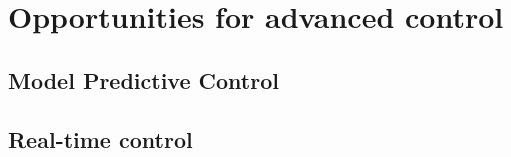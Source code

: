 \section{Opportunities for advanced control}

\subsection{Model Predictive Control}

\subsection{Real-time control}
